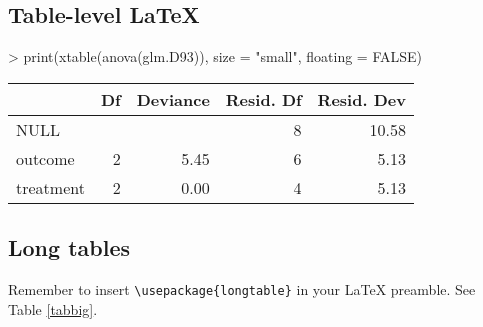 \documentclass[letterpaper]{article}
\begin{document}
\subsection{Table-level \LaTeX}
\begin{Schunk}
\begin{Sinput}
> print(xtable(anova(glm.D93)), size = "small", floating = FALSE)
\end{Sinput}
% latex table generated in R 2.6.0 by xtable 1.5-2 package
% Wed Oct 10 14:26:37 2007
{\small
\begin{tabular}{lrrrr}
  \hline
 & Df & Deviance & Resid. Df & Resid. Dev \\
  \hline
NULL &  &  & 8 & 10.58 \\
  outcome & 2 & 5.45 & 6 & 5.13 \\
  treatment & 2 & 0.00 & 4 & 5.13 \\
   \hline
\end{tabular}
}\end{Schunk}


\subsection{Long tables}
Remember to insert \verb|\usepackage{longtable}| in your LaTeX preamble.
See Table \ref{tabbig}.
\end{document}
